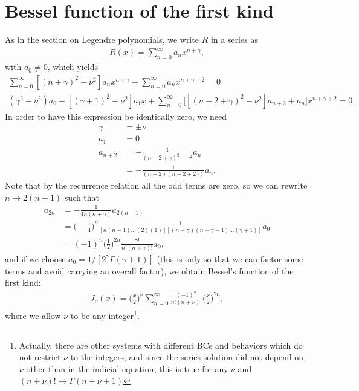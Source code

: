 \section{Bessel function of the first kind}

As in the section on Legendre polynomials, we write $R$ in a series as
\begin{eqnarray}
    R(x) = \sum_{n=0}^{\infty} a_{n} x^{n + \gamma}
,\end{eqnarray}
with $a_0 \ne 0$, which yields
\begin{gather}
    \sum_{n=0}^{\infty} [ (n + \gamma)^2 - \nu^2] a_{n} x^{n+\gamma} + \sum_{n=0}^{\infty} a_{n} x^{n+\gamma+2} = 0 \nonumber \\
    (\gamma^2 - \nu^2)a_0 + [(\gamma+1)^2 - \nu^2] a_1 x + \sum_{n=0}^{\infty} \Big[ [(n+2+\gamma)^2 - \nu^2]a_{n+2} + a_{n} \Big] x^{n+\gamma+2} = 0
.\end{gather}
In order to have this expression be identically zero, we need
\begin{align}
    \gamma &= \pm \nu \\
    a_1 &= 0 \\
    a_{n+2} &= -\frac{1}{(n+2+\gamma)^2 - \gamma^2}a_{n} \nonumber \\
            &= -\frac{1}{(n+2)(n+2+2\gamma)} a_{n}
.\end{align}
Note that by the recurrence relation all the odd terms are zero, so we can rewrite $n \rightarrow 2(n-1)$ such that
\begin{align}
    a_{2n} &= -\frac{1}{4n(n+\gamma)} a_{2(n-1)} \nonumber \\
           &= \Big( - \frac{1}{4} \Big)^{n} \frac{1}{[n(n-1)\ldots(2)(1)][(n+\gamma)(n+\gamma-1)\ldots(\gamma+1)]} a_0 \nonumber \\
           &= (-1)^{n} \Big( \frac{1}{2} \Big)^{2n} \frac{\gamma!}{n!(n+\gamma)!} a_0
,\end{align}
and if we choose $a_0 = 1/[2^{\gamma} \Gamma(\gamma+1)]$ (this is only so that we can factor some terms and avoid carrying an overall factor), we obtain Bessel's function of the first kind:
\begin{align}
    \label{eq:Jnu-series}
    J_{\nu}(x) = \Big( \frac{x}{2} \Big)^{\nu} \sum_{n=0}^{\infty} \frac{(-1)^{n}}{n!(n+\nu)!} \Big( \frac{x}{2} \Big)^{2n}
,\end{align}
where we allow $\nu$ to be any integer\footnote{Actually, there are other systems with different BCs and behaviors which do not restrict $\nu$ to the integers, and since the series solution did not depend on $\nu$ other than in the indicial equation, this is true for any $\nu$ and $(n+\nu)! \rightarrow \Gamma(n+\nu+1)$}.

